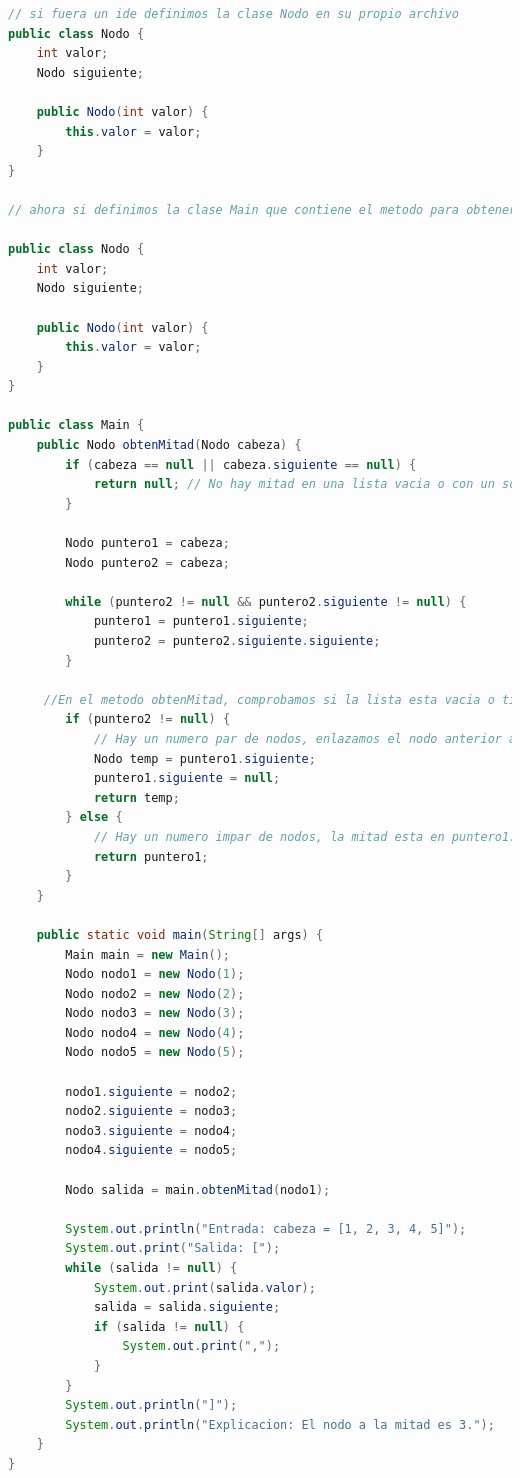 \documentclass{article}
\begin{document}
\begin{enumerate}
    \begin{lstlisting}[language=Java]
        // si fuera un ide definimos la clase Nodo en su propio archivo 
public class Nodo {
    int valor;
    Nodo siguiente;

    public Nodo(int valor) {
        this.valor = valor;
    }
}

// ahora si definimos la clase Main que contiene el metodo para obtener la lista desde la mitad de la lista.

public class Nodo {
    int valor;
    Nodo siguiente;

    public Nodo(int valor) {
        this.valor = valor;
    }
}

public class Main {
    public Nodo obtenMitad(Nodo cabeza) {
        if (cabeza == null || cabeza.siguiente == null) {
            return null; // No hay mitad en una lista vacia o con un solo elemento.
        }

        Nodo puntero1 = cabeza;
        Nodo puntero2 = cabeza;

        while (puntero2 != null && puntero2.siguiente != null) {
            puntero1 = puntero1.siguiente;
            puntero2 = puntero2.siguiente.siguiente;
        }

     //En el metodo obtenMitad, comprobamos si la lista esta vacia o tiene un solo elemento. Si es asi, retornamos null ya que no hay mitad
        if (puntero2 != null) {
            // Hay un numero par de nodos, enlazamos el nodo anterior al nodo a la mitad al nodo nulo.
            Nodo temp = puntero1.siguiente;
            puntero1.siguiente = null;
            return temp;
        } else {
            // Hay un numero impar de nodos, la mitad esta en puntero1.
            return puntero1;
        }
    }

    public static void main(String[] args) {
        Main main = new Main();
        Nodo nodo1 = new Nodo(1);
        Nodo nodo2 = new Nodo(2);
        Nodo nodo3 = new Nodo(3);
        Nodo nodo4 = new Nodo(4);
        Nodo nodo5 = new Nodo(5);

        nodo1.siguiente = nodo2;
        nodo2.siguiente = nodo3;
        nodo3.siguiente = nodo4;
        nodo4.siguiente = nodo5;

        Nodo salida = main.obtenMitad(nodo1);

        System.out.println("Entrada: cabeza = [1, 2, 3, 4, 5]");
        System.out.print("Salida: [");
        while (salida != null) {
            System.out.print(salida.valor);
            salida = salida.siguiente;
            if (salida != null) {
                System.out.print(",");
            }
        }
        System.out.println("]");
        System.out.println("Explicacion: El nodo a la mitad es 3.");
    }
}


\end{lstlisting}
\end{enumerate}
\end{document}
